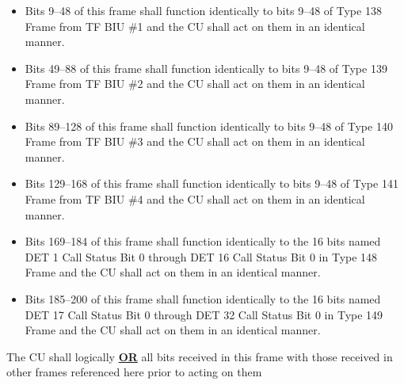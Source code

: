 \documentclass[]{article}
\begin{document}
\begin{itemize}
	\item  Bits 9–48 of this frame shall function identically to bits 9–48 of Type 138 Frame from TF BIU \#1 and the CU shall act on them in an identical manner.
    \item Bits 49–88 of this frame shall function identically to bits 9–48 of Type 139 Frame from TF BIU \#2 and the CU shall act on them in an identical manner.
    \item Bits 89–128 of this frame shall function identically to bits 9–48 of Type 140 Frame from TF BIU \#3 and the CU shall act on them in an identical manner.
    \item Bits 129–168 of this frame shall function identically to bits 9–48 of Type 141 Frame from TF BIU \#4 and the CU shall act on them in an identical manner.
    \item Bits 169–184 of this frame shall function identically to the 16 bits named DET 1 Call Status Bit 0 through DET 16 Call Status Bit 0 in Type 148 Frame and the CU shall act on them in an identical manner.
    \item Bits 185–200 of this frame shall function identically to the 16 bits named DET 17 Call Status Bit 0 through DET 32 Call Status Bit 0 in Type 149 Frame and the CU shall act on them in an identical manner.
\end{itemize}

The CU shall logically \textbf{\underline{OR}} all bits received in this frame with those received in other frames referenced
here prior to acting on them
\end{document}
